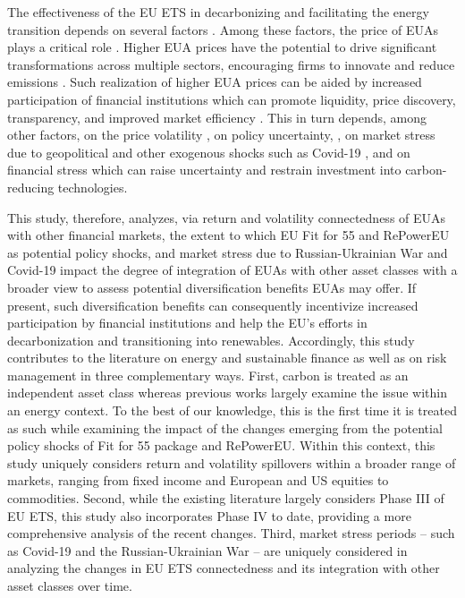 \documentclass[preprint, 3p,
authoryear]{elsarticle} %
\begin{document}
The effectiveness of the EU ETS in decarbonizing and facilitating the
energy transition depends on several factors
\citep{backe_exploring_2023, de_cara_marginal_2011, marin_impact_2018, scheelhaase_options_2021}.
Among these factors, the price of EUAs plays a critical role
\citep{pietzcker_tightening_2021, quemin_raising_2022, lovcha_determinants_2022}.
Higher EUA prices have the potential to drive significant
transformations across multiple sectors, encouraging firms to innovate
and reduce emissions \citep{pietzcker_tightening_2021, recka_2015}. Such
realization of higher EUA prices can be aided by increased participation
of financial institutions which can promote liquidity, price discovery,
transparency, and improved market efficiency
\citep{bohl_impact_2023, corgnet_information_2021}. This in turn
depends, among other factors, on the price volatility
\citep{acworth_emissions_2017, laing_assessing_2013}, on policy
uncertainty,
\citep{raza_forecasting_2023, fang_effect_2018, zhu_does_2020, wang_commodity_2015},
on market stress due to geopolitical and other exogenous shocks such as
Covid-19
\citep{deng_dynamic_2024, yang_time-varying_2022, tiwari_quantile_2022, babar_returns_2024},
and on financial stress
\citep{bakas_impact_2018, ding_time-varying_2021} which can raise
uncertainty and restrain investment into carbon-reducing technologies.

This study, therefore, analyzes, via return and volatility connectedness
of EUAs with other financial markets, the extent to which EU Fit for 55
and RePowerEU as potential policy shocks, and market stress due to
Russian-Ukrainian War and Covid-19 impact the degree of integration of
EUAs with other asset classes with a broader view to assess potential
diversification benefits EUAs may offer. If present, such
diversification benefits can consequently incentivize increased
participation by financial institutions and help the EU's efforts in
decarbonization and transitioning into renewables. Accordingly, this
study contributes to the literature on energy and sustainable finance as
well as on risk management in three complementary ways. First, carbon is
treated as an independent asset class whereas previous works largely
examine the issue within an energy context. To the best of our
knowledge, this is the first time it is treated as such while examining
the impact of the changes emerging from the potential policy shocks of
Fit for 55 package and RePowerEU. Within this context, this study
uniquely considers return and volatility spillovers within a broader
range of markets, ranging from fixed income and European and US equities
to commodities. Second, while the existing literature largely considers
Phase III of EU ETS, this study also incorporates Phase IV to date,
providing a more comprehensive analysis of the recent changes. Third,
market stress periods -- such as Covid-19 and the Russian-Ukrainian War
-- are uniquely considered in analyzing the changes in EU ETS
connectedness and its integration with other asset classes over time.
\end{document}
